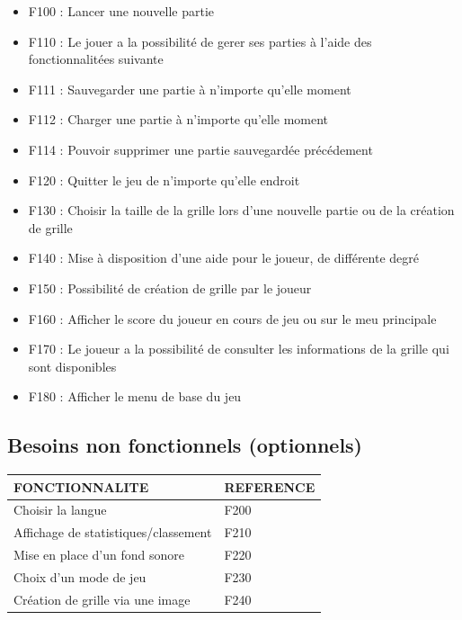 \documentclass[11pt]{article}
\begin{document}
\begin{itemize}
	\item F100 : Lancer une nouvelle partie
	\item F110 : Le jouer a la possibilité de gerer ses parties à l'aide des fonctionnalitées suivante
	\item F111 : Sauvegarder une partie à n'importe qu'elle moment
	\item F112 : Charger une partie à n'importe qu'elle moment
	\item F114 : Pouvoir supprimer une partie sauvegardée précédement
	\item F120 : Quitter le jeu de n'importe qu'elle endroit
	\item F130 : Choisir la taille de la grille lors d'une nouvelle partie ou de la création de grille
	\item F140 : Mise à disposition d'une aide pour le joueur, de différente degré
	\item F150 : Possibilité de création de grille par le joueur
	\item F160 : Afficher le score du joueur en cours de jeu ou sur le meu principale
	\item F170 : Le joueur a la possibilité de consulter les informations de la grille qui sont disponibles
	\item F180 : Afficher le menu de base du jeu
\end{itemize}

\subsection{Besoins non fonctionnels (optionnels)}

\vspace{0,5cm}
\small
\begin{tabular}{|p{10cm}|p{3cm}|}
	\hline
	\textbf{FONCTIONNALITE} & \textbf{REFERENCE}\\
	\hline
	\hline
		Choisir la langue		 									& F200 \\	\cline{1-2}	
		Affichage de statistiques/classement 						& F210 \\	\cline{1-2}	
		Mise en place d'un fond sonore 								& F220 \\	\cline{1-2}	
		Choix d'un mode de jeu										& F230 \\	\cline{1-2}	
		Création de grille via une image							& F240 \\	\cline{1-2}
	\hline
	\end{tabular}
\normalsize \\
\end{document}
